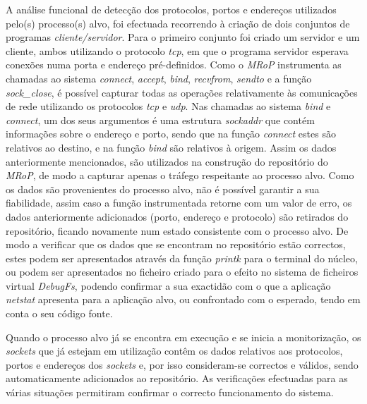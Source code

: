 A análise funcional de detecção dos protocolos, portos e endereços utilizados pelo(s) processo(s) alvo, foi efectuada recorrendo à criação de dois conjuntos de programas \textit{cliente/servidor}.
Para o primeiro conjunto foi criado um servidor e um cliente, ambos utilizando o protocolo \textit{tcp}, em que o programa servidor esperava conexões numa porta e endereço pré-definidos.
Como o \textit{MRoP} instrumenta as chamadas ao sistema \textit{connect}, \textit{accept}, \textit{bind}, \textit{recvfrom}, \textit{sendto} e a função \textit{sock\_close}, é possível capturar todas as operações relativamente às comunicações de rede utilizando os protocolos \textit{tcp} e \textit{udp}.
Nas chamadas ao sistema \textit{bind} e \textit{connect}, um dos seus argumentos é uma estrutura \textit{sockaddr} que contém informações sobre o endereço e porto, sendo que na função \textit{connect} estes são relativos ao destino, e na função \textit{bind} são relativos à origem.
Assim os dados anteriormente mencionados, são utilizados na construção do repositório do \textit{MRoP}, de modo a capturar apenas o tráfego respeitante ao processo alvo.
Como os dados são provenientes do processo alvo, não é possível garantir a sua fiabilidade, assim caso a função instrumentada retorne com um valor de erro, os dados anteriormente adicionados (porto, endereço e protocolo) são retirados do repositório, ficando novamente num estado consistente com o processo alvo.
De modo a verificar que os dados que se encontram no repositório estão correctos, estes podem ser apresentados através da função \textit{printk} para o terminal do núcleo, ou podem ser apresentados no ficheiro criado para o efeito no sistema de ficheiros virtual \textit{DebugFs}, podendo confirmar a sua exactidão com o que a aplicação \textit{netstat} apresenta para a aplicação alvo, ou confrontado com o esperado, tendo em conta o seu código fonte.

Quando o processo alvo já se encontra em execução e se inicia a monitorização, os \textit{sockets} que já estejam em utilização contêm os dados relativos aos protocolos, portos e endereços dos \textit{sockets} e, por isso consideram-se correctos e válidos, sendo automaticamente adicionados ao repositório. As verificações efectuadas para as várias situações permitiram confirmar o correcto funcionamento do sistema.



